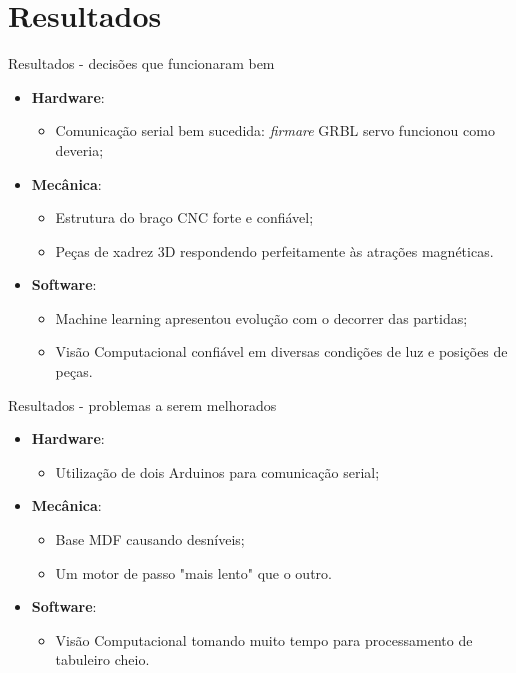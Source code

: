 \documentclass{beamer}
\begin{document}
\section{Resultados}

\begin{frame}{Resultados - decisões que funcionaram bem}
  \begin{itemize}
  \item \textbf{Hardware}:
        \begin{itemize}
            \item Comunicação serial bem sucedida: \textit{firmare} GRBL servo funcionou como deveria;
        \end{itemize}
    \item \textbf{Mecânica}:
        \begin{itemize}
            \item Estrutura do braço CNC forte e confiável;
            \item Peças de xadrez 3D respondendo perfeitamente às atrações magnéticas.
        \end{itemize}
    \item \textbf{Software}:
        \begin{itemize}
            \item Machine learning apresentou evolução com o decorrer das partidas;
            \item Visão Computacional confiável em diversas condições de luz e posições de peças.
        \end{itemize}
  \end{itemize}
\end{frame}

\begin{frame}{Resultados - problemas a serem melhorados}
  \begin{itemize}
  \item \textbf{Hardware}:
        \begin{itemize}
            \item Utilização de dois Arduinos para comunicação serial; 
        \end{itemize}
    \item \textbf{Mecânica}:
        \begin{itemize}
            \item Base MDF causando desníveis;
            \item Um motor de passo "mais lento" que o outro.
        \end{itemize}
    \item \textbf{Software}:
        \begin{itemize}
            \item Visão Computacional tomando muito tempo para processamento de tabuleiro cheio.
        \end{itemize}
  \end{itemize}
\end{frame}
\end{document}
